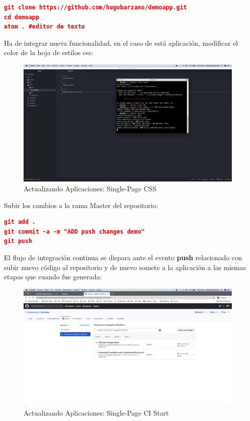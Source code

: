 \documentclass[a4paper,11pt]{book}
\begin{document}
\begin{lstlisting}[language=json,firstnumber=1]
git clone https://github.com/hugobarzano/demoapp.git
cd demoapp
atom . #editor de texto
\end{lstlisting}

 Ha de integrar nueva funcionalidad, en el caso de está aplicación, modificar el color de la hoja de estilos css:
 
 \begin{figure}[H]
\centering
\includegraphics[scale=0.2]{imagenes/casouso/2_5.png}
\caption{ Actualizando Aplicaciones: Single-Page CSS   }
\end{figure}

 Subir los cambios a la rama Master del repositorio:
 
 
\begin{lstlisting}[language=json,firstnumber=1]
git add .
git commit -a -m "ADD push changes demo"
git push
\end{lstlisting}


 
 El flujo de integración continua se dispara ante el evento \textbf{push} relacionado con subir nuevo código al repositorio y de nuevo somete a la aplicación a las mismas etapas que cuando fue generada:
 
  \begin{figure}[H]
\centering
\includegraphics[scale=0.2]{imagenes/casouso/2_6.png}
\caption{  Actualizando Aplicaciones: Single-Page CI Start }
\end{figure}
\end{document}
